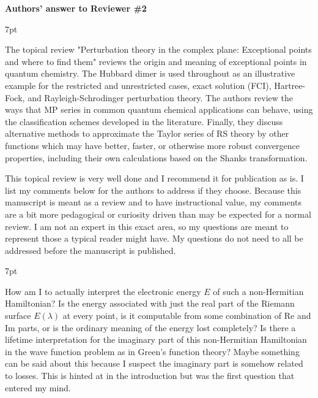 \documentclass[10pt]{letter}
\newenvironment{formal}{%
  \def\FrameCommand{%
    \hspace{1pt}%
    {\color{darkblue}\vrule width 2pt}%
    {\color{formalshade}\vrule width 4pt}%
    \colorbox{formalshade}%
  }%
  \MakeFramed{\advance\hsize-\width\FrameRestore}%
  \noindent\hspace{-4.55pt}%
  \begin{adjustwidth}{}{7pt}%
  \vspace{2pt}\vspace{2pt}%
}
{%
  \vspace{2pt}\end{adjustwidth}\endMakeFramed%
}
\begin{document}
\begin{letter}
\noindent \textbf{\large Authors' answer to Reviewer \#2}

\begin{formal}
The topical review "Perturbation theory in the complex plane: Exceptional points and where to find them" reviews the origin and meaning of exceptional points in quantum chemistry. 
The Hubbard dimer is used throughout as an illustrative example for the restricted and unrestricted cases, exact solution (FCI), Hartree-Fock, and Rayleigh-Schrodinger perturbation theory. 
The authors review the ways that MP series in common quantum chemical applications can behave, using the classification schemes developed in the literature. 
Finally, they discuss alternative methods to approximate the Taylor series of RS theory by other functions which may have better, faster, or otherwise more robust convergence properties, including their own calculations based on the Shanks transformation.

\noindent This topical review is very well done and I recommend it for publication as is. 
I list my comments below for the authors to address if they choose. 
Because this manuscript is meant as a review and to have instructional value, my comments are a bit more pedagogical or curiosity driven than may be expected for a normal review. 
I am not an expert in this exact area, so my questions are meant to represent those a typical reader might have. 
My questions do not need to all be addressed before the manuscript is published.
\end{formal}


\begin{formal}
How am I to actually interpret the electronic energy $E$ of such a non-Hermitian Hamiltonian? 
	Is the energy associated with just the real part of the Riemann surface $E(\lambda)$ at every point, is it computable from some combination of Re and Im parts, or is the ordinary meaning of the energy lost completely? 
	Is there a lifetime interpretation for the imaginary part of this non-Hermitian Hamiltonian in the wave function problem as in Green's function theory? 
	Maybe something can be said about this because I suspect the imaginary part is somehow related to losses. 
	This is hinted at in the introduction but was the first question that entered my mind.
\end{formal}


\end{letter}
\end{document}
